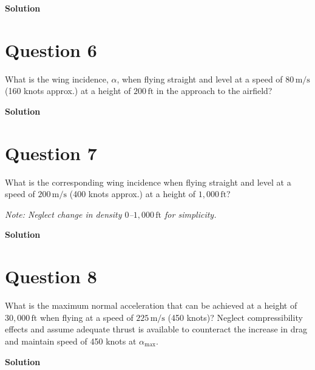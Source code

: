 \documentclass[12pt,a4paper]{article}
\begin{document}
\textbf{Solution}
\vspace{2cm}

\newpage
\section*{Question 6}
What is the wing incidence, $\alpha$, when flying straight and level at a speed of $80\,\mathrm{m/s}$ (160 knots approx.) at a height of $200\,\mathrm{ft}$ in the approach to the airfield?

\textbf{Solution}
\vspace{2cm}

\section*{Question 7}
What is the corresponding wing incidence when flying straight and level at a speed of $200\,\mathrm{m/s}$ (400 knots approx.) at a height of $1{,}000\,\mathrm{ft}$?

\textit{Note: Neglect change in density $0$--$1{,}000\,\mathrm{ft}$ for simplicity.}

\textbf{Solution}
\vspace{2cm}

\newpage
\section*{Question 8}
What is the maximum normal acceleration that can be achieved at a height of $30{,}000\,\mathrm{ft}$ when flying at a speed of $225\,\mathrm{m/s}$ (450 knots)? Neglect compressibility effects and assume adequate thrust is available to counteract the increase in drag and maintain speed of 450 knots at $\alpha_{\max}$.

\textbf{Solution}
\vspace{2cm}
\end{document}
